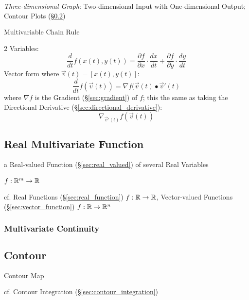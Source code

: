 {\emph{Three-dimensional Graph}: Two-dimensional Input with One-dimensional
Output; Contour Plots (\S\ref{sec:contour})

Multivariable Chain Rule

2 Variables:
\[
  \frac{d}{dt} f(x(t),y(t)) =
    \frac{\partial{f}}{\partial{x}} \cdot \frac{dx}{dt}
      + \frac{\partial{f}}{\partial{y}} \cdot \frac{dy}{dt}
\]
Vector form where $\vec{v}(t) = [x(t),y(t)]$:
\[
  \frac{d}{dt}f(\vec{v}(t)) = \nabla{f(\vec{v}(t)}\bullet{\vec{v}'(t)}
\]
where $\nabla{f}$ is the Gradient (\S\ref{sec:gradient}) of $f$; this the same
as taking the Directional Derivative (\S\ref{sec:directional_derivative}):
\[
  \nabla_{\vec{v}'(t)}f(\vec{v}(t))
\]



\subsection{Real Multivariate Function}\label{sec:real_multivariate_function}

a Real-valued Function (\S\ref{sec:real_valued}) of several Real Variables

$f : \mathbb{R}^m \rightarrow \mathbb{R}$

cf. Real Functions (\S\ref{sec:real_function}) $f : \mathbb{R} \rightarrow \mathbb{R}$,
Vector-valued Functions (\S\ref{sec:vector_function})
$f : \mathbb{R} \rightarrow \mathbb{R}^n$



\subsubsection{Multivariate Continuity}\label{sec:multivariate_continuity}



\subsection{Contour}\label{sec:contour}

Contour Map

cf. Contour Integration (\S\ref{sec:contour_integration})



}
